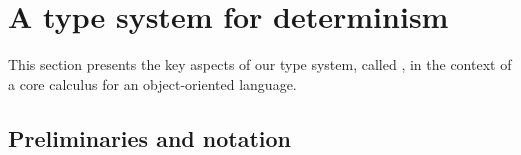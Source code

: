 \section{A type system for determinism}\label{design}

This section presents the key aspects of our type system,
called \ourTypeSystem, in the context of a core calculus for an
object-oriented language.


\subsection{Preliminaries and notation}

